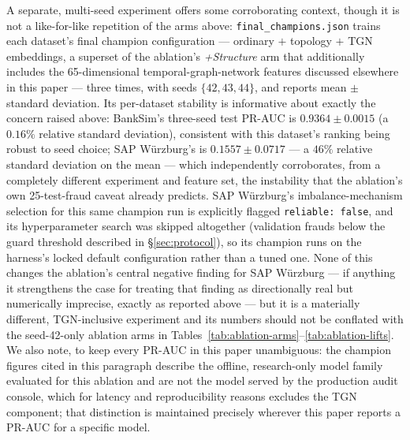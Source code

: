 A separate, multi-seed experiment offers some corroborating context, though it is not a like-for-like repetition of the arms above: \texttt{final\_champions.json} trains each dataset's final champion configuration — ordinary $+$ topology $+$ TGN embeddings, a superset of the ablation's \emph{+Structure} arm that additionally includes the 65-dimensional temporal-graph-network features discussed elsewhere in this paper — three times, with seeds $\{42,43,44\}$, and reports mean $\pm$ standard deviation. Its per-dataset stability is informative about exactly the concern raised above: BankSim's three-seed test PR-AUC is $0.9364 \pm 0.0015$ (a $0.16\%$ relative standard deviation), consistent with this dataset's ranking being robust to seed choice; SAP W\"urzburg's is $0.1557 \pm 0.0717$ — a $46\%$ relative standard deviation on the mean — which independently corroborates, from a completely different experiment and feature set, the instability that the ablation's own 25-test-fraud caveat already predicts. SAP W\"urzburg's imbalance-mechanism selection for this same champion run is explicitly flagged \texttt{reliable:~false}, and its hyperparameter search was skipped altogether (validation frauds below the guard threshold described in \S\ref{sec:protocol}), so its champion runs on the harness's locked default configuration rather than a tuned one. None of this changes the ablation's central negative finding for SAP W\"urzburg — if anything it strengthens the case for treating that finding as directionally real but numerically imprecise, exactly as reported above — but it is a materially different, TGN-inclusive experiment and its numbers should not be conflated with the seed-42-only ablation arms in Tables~\ref{tab:ablation-arms}--\ref{tab:ablation-lifts}. We also note, to keep every PR-AUC in this paper unambiguous: the champion figures cited in this paragraph describe the offline, research-only model family evaluated for this ablation and are not the model served by the production audit console, which for latency and reproducibility reasons excludes the TGN component; that distinction is maintained precisely wherever this paper reports a PR-AUC for a specific model.

